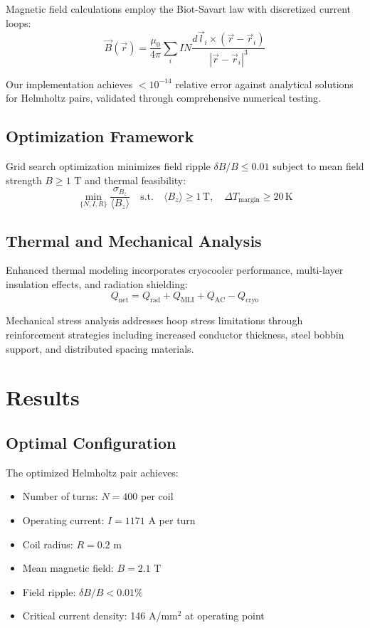 \documentclass[10pt,twocolumn]{article}
\begin{document}
Magnetic field calculations employ the Biot-Savart law with discretized current loops:
\begin{equation}
\vec{B}(\vec{r}) = \frac{\mu_0}{4\pi} \sum_{i} I N \frac{d\vec{l}_i \times (\vec{r} - \vec{r}_i)}{|\vec{r} - \vec{r}_i|^3}
\end{equation}

Our implementation achieves $<10^{-14}$ relative error against analytical solutions for Helmholtz pairs, validated through comprehensive numerical testing.

\subsection{Optimization Framework}

Grid search optimization minimizes field ripple $\delta B / B \leq 0.01$ subject to mean field strength $B \geq 1$ T and thermal feasibility:
\begin{equation}
\min_{\{N,I,R\}} \frac{\sigma_{B_z}}{\langle B_z \rangle} \quad \text{s.t.} \quad \langle B_z \rangle \geq 1\,\text{T}, \quad \Delta T_{\text{margin}} \geq 20\,\text{K}
\end{equation}

\subsection{Thermal and Mechanical Analysis}

Enhanced thermal modeling incorporates cryocooler performance, multi-layer insulation effects, and radiation shielding:
\begin{equation}
Q_{\text{net}} = Q_{\text{rad}} + Q_{\text{MLI}} + Q_{\text{AC}} - Q_{\text{cryo}}
\end{equation}

Mechanical stress analysis addresses hoop stress limitations through reinforcement strategies including increased conductor thickness, steel bobbin support, and distributed spacing materials.

\section{Results}

\subsection{Optimal Configuration}

The optimized Helmholtz pair achieves:
\begin{itemize}
\item Number of turns: $N = 400$ per coil
\item Operating current: $I = 1171$ A per turn
\item Coil radius: $R = 0.2$ m
\item Mean magnetic field: $B = 2.1$ T
\item Field ripple: $\delta B / B < 0.01\%$
\item Critical current density: 146 A/mm$^2$ at operating point
\end{itemize}
\end{document}
